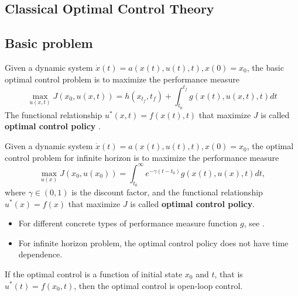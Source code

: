 
\begin{refsection}
\startcontents[chapters]
\chapter{Classical Optimal Control Theory}\label{ch:deterministic-optimal-control-theory}
	
\section{Basic problem}
\begin{definition}

\end{definition}

\begin{definition}
Given a dynamic system $\dot{x}(t) = a(x(t),u(t),t),x(0)=x_0$, the basic optimal control problem is to maximize the performance measure
$$\max_{u(x,t)} J(x_0,u(x,t)) = h(x_{t_f},t_f) + \int_{t_0}^{t_f} g(x(t),u(x,t),t) dt$$
The functional relationship $u^*(x,t)=f(x(t),t)$ that maximize $J$ is called \textbf{optimal control policy} .
\end{definition}

\begin{definition}
Given a dynamic system $\dot{x}(t) = a(x(t),u(t),t),x(0)=x_0$, the optimal control problem for infinite horizon is to maximize the performance measure
$$\max_{u(x)} J(x_0,u(x_0)) = \int_{t_0}^{\infty} e^{-\gamma (t-t_0)}g(x(t),u(x),t) dt,$$
where $\gamma \in (0,1)$ is the discount factor, and the functional relationship $u^*(x)=f(x)$ that maximize $J$ is called \textbf{optimal control policy}.
\end{definition}

\begin{remark}[interpretation]\hfill
\begin{itemize}
	\item For different concrete types of performance measure function $g$, see \cite[30]{kirk2012optimal}.
	\item For infinite horizon problem, the optimal control policy does not have time dependence.
\end{itemize}
\end{remark}


\begin{definition}
If the optimal control is a function of initial state $x_0$ and $t$, that is $u^*(t)=f(x_0,t)$, then the optimal control is open-loop control.
\end{definition}


\end{refsection}
